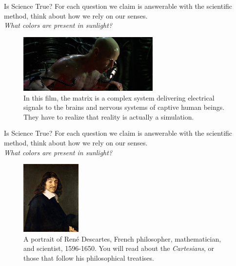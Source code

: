 \documentclass{beamer}
\begin{document}
\begin{frame}{Is Science True?}
For each question we claim is answerable with the scientific method, think about how we rely on our senses. \\ \vspace{0.5cm}
\textit{What colors are present in sunlight?}
\begin{figure}
\centering
\includegraphics[width=7cm]{figures/matrix2.jpg}
\caption{In this film, the matrix is a complex system delivering electrical signals to the brains and nervous systems of captive human beings.  They have to realize that reality is actually a simulation.}
\end{figure}
\end{frame}

\begin{frame}{Is Science True?}
For each question we claim is answerable with the scientific method, think about how we rely on our senses. \\ \vspace{0.5cm}
\textit{What colors are present in sunlight?}
\begin{figure}
\centering
\includegraphics[width=3cm]{figures/rene.jpg}
\caption{A portrait of Ren\'{e} Descartes, French philosopher, mathematician, and scientist, 1596-1650.  You will read about the \textit{Cartesians}, or those that follow his philosophical treatises.}
\end{figure}
\end{frame}
\end{document}
